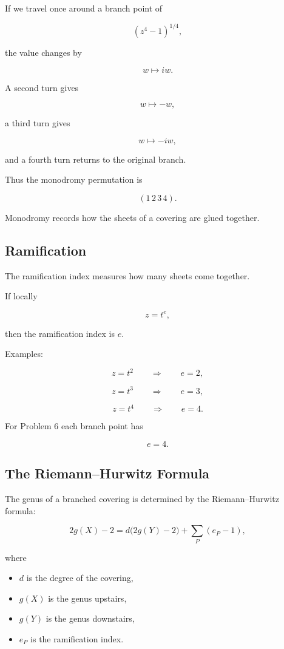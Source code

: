 \documentclass[12pt,a4paper]{article}
\theoremstyle{notespace}
\begin{document}
If we travel once around a branch point of

\[
(z^4-1)^{1/4},
\]

the value changes by

\[
w\mapsto iw.
\]

A second turn gives

\[
w\mapsto -w,
\]

a third turn gives

\[
w\mapsto -iw,
\]

and a fourth turn returns to the original branch.

Thus the monodromy permutation is

\[
(1\,2\,3\,4).
\]

Monodromy records how the sheets of a covering are glued together.

\subsection{Ramification}

The ramification index measures how many sheets come together.

If locally

\[
z=t^e,
\]

then the ramification index is \(e\).

Examples:

\[
z=t^2
\qquad\Rightarrow\qquad e=2,
\]

\[
z=t^3
\qquad\Rightarrow\qquad e=3,
\]

\[
z=t^4
\qquad\Rightarrow\qquad e=4.
\]

For Problem 6 each branch point has

\[
e=4.
\]

\subsection{The Riemann--Hurwitz Formula}

The genus of a branched covering is determined by the Riemann--Hurwitz formula:

\[
2g(X)-2
=
d\bigl(2g(Y)-2\bigr)
+
\sum_{P}(e_P-1),
\]

where

\begin{itemize}
	\item \(d\) is the degree of the covering,
	\item \(g(X)\) is the genus upstairs,
	\item \(g(Y)\) is the genus downstairs,
	\item \(e_P\) is the ramification index.
\end{itemize}
\end{document}
